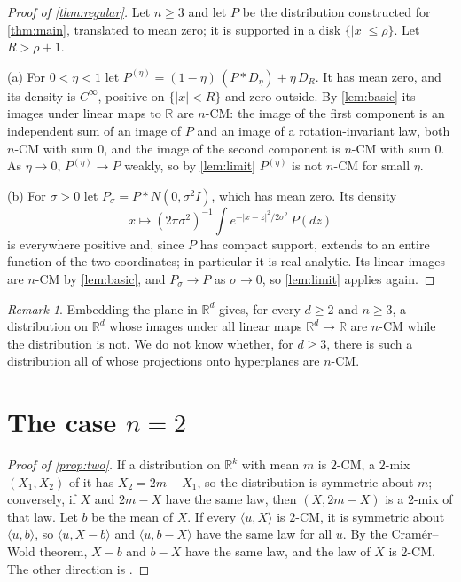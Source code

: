 \documentclass[11pt]{article}
\theoremstyle{definition}
\theoremstyle{remark}
\newtheorem{remark}[theorem]{Remark}
\newcommand{\R}{\mathbb{R}}
\begin{document}
\begin{proof}[Proof of \cref{thm:regular}]
Let $n\ge 3$ and let $P$ be the distribution constructed for \cref{thm:main}, translated to mean zero; it is
supported in a disk $\{|x|\le\rho\}$. Let $R>\rho+1$.

(a) For $0<\eta<1$ let $P^{(\eta)}=(1-\eta)\,(P*D_\eta)+\eta\,D_R$. It has mean zero, and its density is $C^\infty$,
positive on $\{|x|<R\}$ and zero
outside. By \cref{lem:basic} its images under linear maps to $\R$ are $n$-CM: the image of the first component is an
independent sum of an image of $P$ and an image of a rotation-invariant law, both $n$-CM with sum $0$, and the image
of the second component is $n$-CM with sum $0$. As $\eta\to0$, $P^{(\eta)}\to P$ weakly, so by \cref{lem:limit} $P^{(\eta)}$ is
not $n$-CM for small $\eta$.

(b) For $\sigma>0$ let $P_\sigma=P*N(0,\sigma^2I)$, which has mean zero. Its density
\[
x\mapsto(2\pi\sigma^2)^{-1}\int e^{-|x-z|^2/2\sigma^2}\,P(dz)
\]
is everywhere positive and, since $P$ has compact
support, extends to an entire function of the two coordinates; in particular it is real analytic. Its linear images
are $n$-CM by \cref{lem:basic}, and $P_\sigma\to P$ as $\sigma\to0$, so \cref{lem:limit} applies again.
\end{proof}


\begin{remark}
Embedding the plane in $\R^d$ gives, for every $d\ge2$ and $n\ge3$, a distribution on $\R^d$ whose images under all
linear maps $\R^d\to\R$ are $n$-CM while the distribution is not. We do not know whether, for $d\ge3$, there is such
a distribution all of whose projections onto hyperplanes are $n$-CM.
\end{remark}

\section{The case \texorpdfstring{$n=2$}{n=2}}\label{sec:two}

\begin{proof}[Proof of \cref{prop:two}]
If a distribution on $\R^k$ with mean $m$ is $2$-CM, a $2$-mix $(X_1,X_2)$ of it has $X_2=2m-X_1$, so the
distribution is symmetric about $m$; conversely, if $X$ and $2m-X$ have the same law, then $(X,2m-X)$ is a $2$-mix
of that law. Let $b$
be the mean of $X$. If every $\langle u,X\rangle$ is $2$-CM, it is symmetric about $\langle u,b\rangle$, so
$\langle u,X-b\rangle$ and $\langle u,b-X\rangle$ have the same law for all $u$. By the Cram\'er--Wold theorem,
$X-b$ and $b-X$ have the same law, and the law of $X$ is $2$-CM. The other direction is \cite[Proposition~6]{Wang}.
\end{proof}
\end{document}
